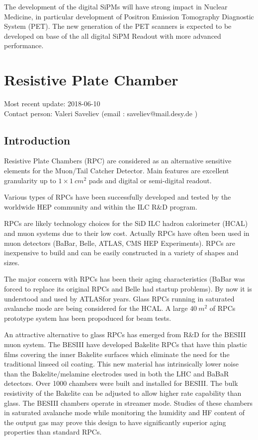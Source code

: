 The development of the digital SiPMs will have strong impact in Nuclear Medicine, in particular development of Positron Emission Tomography Diagnostic System (PET). The new generation of the PET scanners is expected to be developed on base of the all digital SiPM Readout with more advanced performance.

\section{Resistive Plate Chamber }
Most recent update: 2018-06-10 \\
Contact person: Valeri Saveliev (email : saveliev@mail.desy.de )

\subsection{Introduction}

Resistive Plate Chambers (RPC) are considered as an alternative sensitive elements for the Muon/Tail Catcher Detector.
Main features are excellent granularity up to $1\times\SI{1}{cm^2}$ pads and digital or semi-digital readout.

Various types of RPCs have been successfully developed and tested by the worldwide HEP community and within the ILC R\&D program.

RPCs are likely technology choices for the SiD ILC hadron calorimeter (HCAL) and muon systems due to their low cost. Actually
RPCs have often been used in muon detectors (BaBar, Belle, ATLAS, CMS HEP Experiments). RPCs are inexpensive to build and can be easily constructed in a variety of shapes and sizes.

The major concern with RPCs has been their aging characteristics (BaBar was forced to replace its original RPCs and Belle had startup problems). By now it is understood and used by ATLAS\CMS for years.
Glass RPCs running in saturated avalanche mode are being considered for the HCAL. A large $\SI{40}{m^2}$ of RPCs prototype system has been propoduced for beam tests.

An attractive alternative to glass RPCs has emerged from R\&D for the BESIII muon system. The BESIII have developed Bakelite RPCs that have thin plastic films covering the inner Bakelite surfaces which eliminate the need for the traditional linseed oil coating. This new material has intrinsically lower noise than the Bakelite/melamine electrodes used in both the LHC and BaBaR detectors. Over 1000 chambers were built and installed for BESIII. The bulk resistivity of the Bakelite can be adjusted to allow higher rate capability than glass. The BESIII chambers operate in streamer mode. Studies of these chambers in saturated avalanche mode while monitoring the humidity and HF content of the output gas may prove this design to have significantly superior aging properties than standard RPCs.

